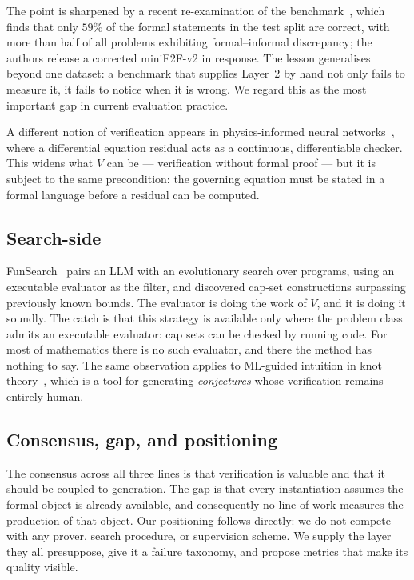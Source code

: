 \documentclass[11pt,a4paper]{article}
\begin{document}
The point is sharpened by a recent re-examination of the
benchmark~\cite{ospanov2025minif2f}, which finds that only $59\%$ of the formal
statements in the test split are correct, with more than half of all problems
exhibiting formal--informal discrepancy; the authors release a corrected
miniF2F-v2 in response.  The lesson generalises beyond one dataset: a benchmark
that supplies Layer~2 by hand not only fails to measure it, it fails to notice
when it is wrong.  We regard this as the most important gap in current
evaluation practice.

A different notion of verification appears in physics-informed neural
networks~\cite{raissi2019pinn}, where a differential equation residual acts as a
continuous, differentiable checker.  This widens what $V$ can be --- verification
without formal proof --- but it is subject to the same precondition: the
governing equation must be stated in a formal language before a residual can be
computed.

\subsection{Search-side}
FunSearch~\cite{romera2024funsearch} pairs an LLM with an evolutionary search
over programs, using an executable evaluator as the filter, and discovered
cap-set constructions surpassing previously known bounds.  The evaluator is
doing the work of $V$, and it is doing it soundly.  The catch is that this
strategy is available only where the problem class admits an executable
evaluator: cap sets can be checked by running code.  For most of mathematics
there is no such evaluator, and there the method has nothing to say.  The
same observation applies to ML-guided intuition in knot
theory~\cite{davies2021advancing}, which is a tool for generating \emph{conjectures}
whose verification remains entirely human.

\subsection{Consensus, gap, and positioning}
The consensus across all three lines is that verification is valuable and that
it should be coupled to generation.  The gap is that every instantiation assumes
the formal object is already available, and consequently no line of work measures
the production of that object.  Our positioning follows directly: we do not
compete with any prover, search procedure, or supervision scheme.  We supply the
layer they all presuppose, give it a failure taxonomy, and propose metrics that
make its quality visible.
\end{document}
